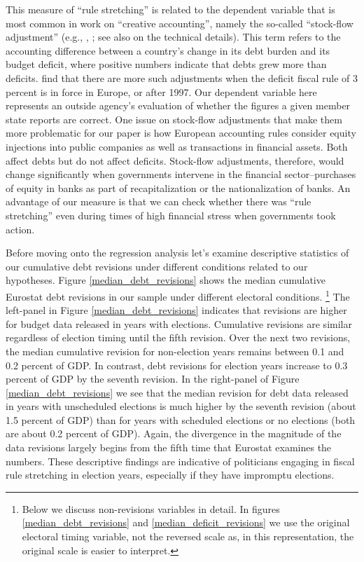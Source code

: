 \documentclass[]{article}
\begin{document}
This measure of ``rule stretching'' is related to the dependent variable that is most common in work on ``creative accounting'', namely the so-called ``stock-flow adjustment'' (e.g., \cite{vonHagenWolff2006}, \cite{Alt2014}; see also \cite{Seiferling2013} on the technical details).  This term refers to the accounting difference between a country's change in its debt burden and its budget deficit, where positive numbers indicate that debts grew more than deficits.  \cite{vonHagenWolff2006} find that there are more such adjustments when the deficit fiscal rule of 3 percent is in force in Europe, or after 1997.  Our dependent variable here represents an outside agency's evaluation of whether the figures a given member state reports are correct.  One issue on stock-flow adjustments that make them more problematic for our paper is how European accounting rules consider equity injections into public companies as well as transactions in financial assets. Both affect debts but do not affect deficits. Stock-flow adjustments, therefore, would change significantly when governments intervene in the financial sector--purchases of equity in banks as part of recapitalization or the nationalization of banks.  An advantage of our measure is that we can check whether there was ``rule stretching'' even during times of high financial stress when governments took action.

Before moving onto the regression analysis let's examine descriptive statistics of our cumulative debt revisions under different conditions related to our hypotheses. Figure \ref{median_debt_revisions} shows the median cumulative Eurostat debt revisions in our sample under different electoral conditions.  \footnote{Below we discuss non-revisions variables in detail. In figures \ref{median_debt_revisions} and \ref{median_deficit_revisions} we use the original electoral timing variable, not the reversed scale as, in this representation, the original scale is easier to interpret.} The left-panel in Figure \ref{median_debt_revisions} indicates that revisions are higher for budget data released in years with elections. Cumulative revisions are similar regardless of election timing until the fifth revision. Over the next two revisions, the median cumulative revision for non-election years remains between 0.1 and 0.2 percent of GDP. In contrast, debt revisions for election years increase to 0.3 percent of GDP by the seventh revision. In the right-panel of Figure \ref{median_debt_revisions} we see that the median revision for debt data released in years with unscheduled elections is much higher by the seventh revision (about 1.5 percent of GDP) than for years with scheduled elections or no elections (both are about 0.2 percent of GDP). Again, the divergence in the magnitude of the data revisions largely begins from the fifth time that Eurostat examines the numbers. These descriptive findings are indicative of politicians engaging in fiscal rule stretching in election years, especially if they have impromptu elections.
\end{document}
